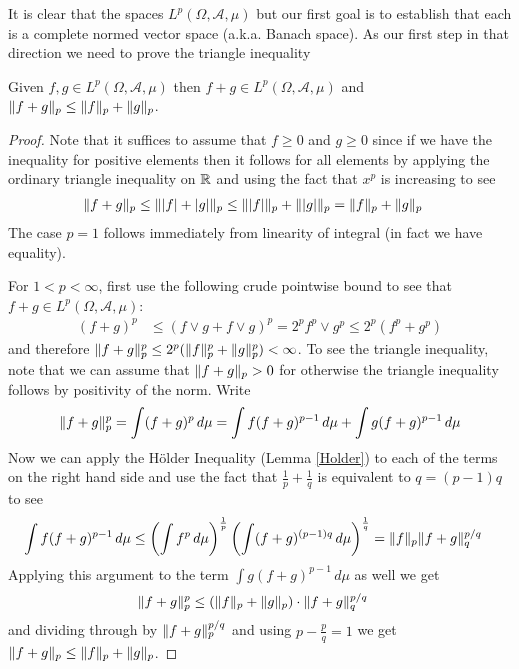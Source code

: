 It is clear that the spaces $L^p(\Omega, \mathcal{A}, \mu)$ but our first goal is to establish that each is a complete
normed vector space (a.k.a. Banach space).  As our first step in that
direction we need to prove the triangle inequality
\begin{lem}\label{MinkowskiInequality}Given $f,g
  \in L^p(\Omega,  \mathcal{A}, \mu)$ then $f+g \in L^p(\Omega,
  \mathcal{A}, \mu)$ and $\lVert f+g \rVert_p \leq \lVert f \rVert_p + \lVert g \rVert_p$.
\end{lem}
\begin{proof}
Note that it suffices to assume that $f \geq 0$ and $g \geq 0$ since
if we have the inequality for positive elements then it follows for
all elements by applying the ordinary triangle inequality on $\mathbb{R}$
and using the fact that $x^p$ is increasing to see
\begin{align*}
\lVert f+g \rVert_p &\leq \lVert \left \vert f \right \vert+\left \vert g \right \vert \rVert_p \leq
\lVert \left \vert f \right \vert \rVert_p+\lVert \left \vert g \right \vert \rVert_p = \lVert f \rVert_p+\lVert g \rVert_p 
\end{align*}
The case $p=1$ follows immediately from linearity of integral (in fact
we have equality).  

For $1 < p < \infty$, first use the following
crude pointwise bound to see that $f+g \in L^p(\Omega,  \mathcal{A}, \mu)$:
\begin{align*}
(f+g)^p &\leq (f \vee g + f \vee g)^p = 2^p f^p \vee g^p \leq 2^p (f^p
+ g^p)
\end{align*}
and therefore $\lVert f+g \rVert_p^p \leq 2^p (\lVert f \rVert_p^p + \lVert g \rVert_p^p) <
\infty$.  To see the triangle inequality, note that we can assume that
$\lVert f+g \rVert_p > 0$ for otherwise the triangle inequality follows by
positivity of the norm.  Write
\begin{align*}
\lVert f+g \rVert_p^p &= \int (f+g)^p \, d\mu = \int f (f+g)^{p-1} \, d\mu +
\int g (f+g)^{p-1} \, d\mu \\
\end{align*}
Now we can apply the H\"{o}lder Inequality (Lemma
\ref{Holder}) to each of the terms on the right hand side and use the
fact that $\frac{1}{p} + \frac{1}{q}$ is equivalent to $q = (p-1)q$ to see
\begin{align*}
\int f (f+g)^{p-1} \, d\mu &\leq \left(\int f^p \,
  d\mu\right)^\frac{1}{p}\left(\int (f+g)^{(p-1)q} \,
  d\mu\right)^\frac{1}{q} =\lVert f \rVert_p \lVert f+g \rVert_q^{p/q}
\end{align*}
Applying this argument to the term $\int g (f+g)^{p-1} \, d\mu$ as
well we get
\begin{align*}
\lVert f+g \rVert_p^p &\leq  (\lVert f \rVert_p + \lVert g \rVert_p) \cdot
\lVert f+g \rVert_q^{p/q}
\end{align*}
and dividing through by $\lVert f+g \rVert_p^{p/q}$ and using $p - \frac{p}{q}=1$ we get $\lVert f+g \rVert_p \leq  \lVert f \rVert_p + \lVert g \rVert_p$.
\end{proof}

